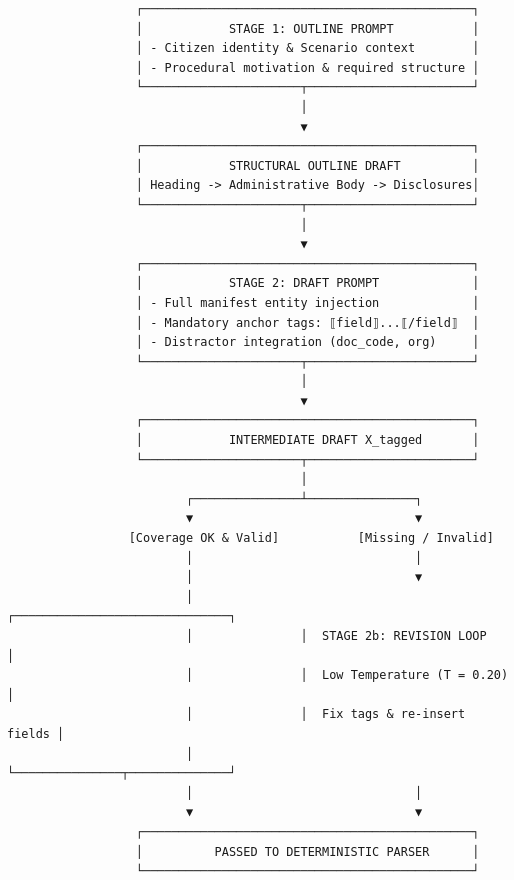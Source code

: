 \documentclass[
]{article}
\begin{document}
\begin{verbatim}
                  ┌──────────────────────────────────────────────┐
                  │            STAGE 1: OUTLINE PROMPT           │
                  │ - Citizen identity & Scenario context        │
                  │ - Procedural motivation & required structure │
                  └──────────────────────┬───────────────────────┘
                                         │
                                         ▼
                  ┌──────────────────────────────────────────────┐
                  │            STRUCTURAL OUTLINE DRAFT          │
                  │ Heading -> Administrative Body -> Disclosures│
                  └──────────────────────┬───────────────────────┘
                                         │
                                         ▼
                  ┌──────────────────────────────────────────────┐
                  │            STAGE 2: DRAFT PROMPT             │
                  │ - Full manifest entity injection             │
                  │ - Mandatory anchor tags: ⟦field⟧...⟦/field⟧  │
                  │ - Distractor integration (doc_code, org)     │
                  └──────────────────────┬───────────────────────┘
                                         │
                                         ▼
                  ┌──────────────────────────────────────────────┐
                  │            INTERMEDIATE DRAFT X_tagged       │
                  └──────────────────────┬───────────────────────┘
                                         │
                         ┌───────────────┴───────────────┐
                         ▼                               ▼
                 [Coverage OK & Valid]           [Missing / Invalid]
                         │                               │
                         │                               ▼
                         │               ┌──────────────────────────────┐
                         │               │  STAGE 2b: REVISION LOOP     │
                         │               │  Low Temperature (T = 0.20)  │
                         │               │  Fix tags & re-insert fields │
                         │               └───────────────┬──────────────┘
                         │                               │
                         ▼                               ▼
                  ┌──────────────────────────────────────────────┐
                  │          PASSED TO DETERMINISTIC PARSER      │
                  └──────────────────────────────────────────────┘
\end{verbatim}
\end{document}
